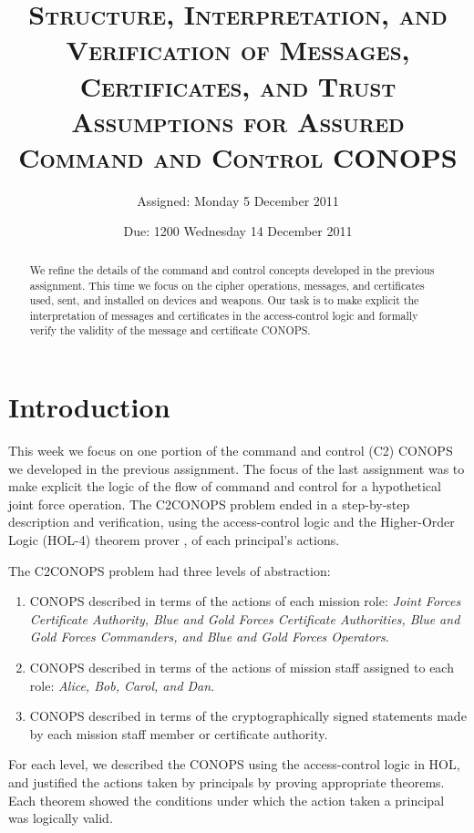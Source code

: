 \message{ !name(secureMessages.tex)}\documentclass[10pt,twoside]{article}
\title{\textsc{Structure, Interpretation, and Verification of
    Messages, Certificates, and Trust Assumptions for Assured Command
    and Control CONOPS}}
\author{Assigned: Monday 5 December 2011}
\date{Due: 1200 Wednesday 14 December 2011}
\begin{document}








\maketitle
\thispagestyle{empty}
\author{}
\maketitle

\begin{abstract}
  We refine the details of the command and control concepts developed
  in the previous assignment. This time we focus on the cipher
  operations, messages, and certificates used, sent, and installed on
  devices and weapons. Our task is to make explicit the interpretation
  of messages and certificates in the access-control logic and
  formally verify the validity of the message and certificate CONOPS.
\end{abstract}

\section{Introduction}
\label{sec:introduction}

This week we focus on one portion of the command and control (C2)
CONOPS we developed in the previous assignment. The focus of the last
assignment was to make explicit the logic of the flow of command and
control for a hypothetical joint force operation.  The C2CONOPS
problem ended in a step-by-step description and verification, using
the access-control logic \cite{ACST} and the Higher-Order Logic
(HOL-4) theorem prover \cite{HOL}, of each principal's actions.

The C2CONOPS problem had three levels of abstraction:
\begin{enumerate}
\item CONOPS described in terms of the actions of each mission role:
  \emph{Joint Forces Certificate Authority, Blue and Gold Forces
    Certificate Authorities, Blue and Gold Forces Commanders, and Blue
    and Gold Forces Operators}.
\item CONOPS described in terms of the actions of mission staff
  assigned to each role: \emph{Alice, Bob, Carol, and Dan}.
\item CONOPS described in terms of the cryptographically signed
  statements made by each mission staff member or certificate
  authority.
\end{enumerate}
For each level, we described the CONOPS using the access-control logic
in HOL, and justified the actions taken by principals by proving
appropriate theorems. Each theorem showed the conditions under which
the action taken a principal was logically valid.
\end{document}
